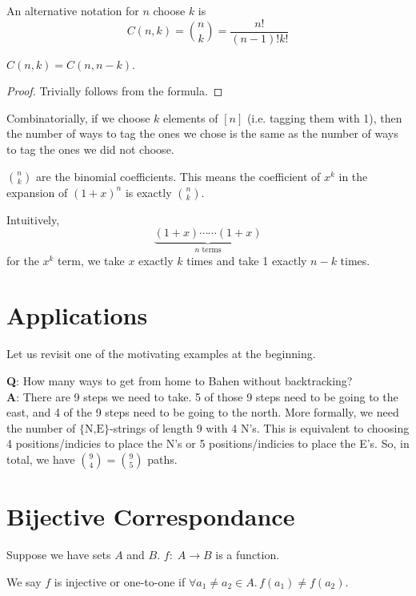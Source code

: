 An alternative notation for $n$ choose $k$ is
$$
C(n,k) = \binom{n}{k} = \frac{n!}{(n-1)!k!}
$$

\begin{corollary}
   $C(n,k) = C(n,n-k)$.
\end{corollary}

\begin{proof}
   Trivially follows from the formula.
\end{proof}

Combinatorially, if we choose $k$ elements of $[n]$ (i.e. tagging them with 1), then the number of ways to tag the ones we chose is the same as the number of ways to tag the ones we did not choose.

\begin{remark}
   $\binom{n}{k}$ are the binomial coefficients. This means the coefficient of $x^k$ in the expansion of $(1+x)^n$ is exactly $\binom{n}{k}$. 
\end{remark}
Intuitively,
$$
\underbrace{(1+x) \cdots \cdots (1+x)}_{\text{$n$ terms}}
$$
for the $x^k$ term, we take $x$ exactly $k$ times and take 1 exactly $n-k$ times.

\section{Applications}

Let us revisit one of the motivating examples at the beginning.

\textbf{Q}: How many ways to get from home to Bahen without backtracking? \\
\textbf{A}: There are 9 steps we need to take. 5 of those 9 steps need to be going to the east, and 4 of the 9 steps need to be going to the north. More formally, we need the number of $\{\text{N,E}\}$-strings of length 9 with 4 N's. This is equivalent to choosing 4 positions/indicies to place the N's or 5 positions/indicies to place the E's. So, in total, we have $\binom{9}{4} = \binom{9}{5}$ paths.

\section{Bijective Correspondance}

Suppose we have sets $A$ and $B$. $f:\;A\to B$ is a function.

\begin{definition}[Injective]
   We say $f$ is injective or one-to-one if $\forall a_1\neq a_2 \in A.\, f(a_1) \neq f(a_2)$.
\end{definition}


